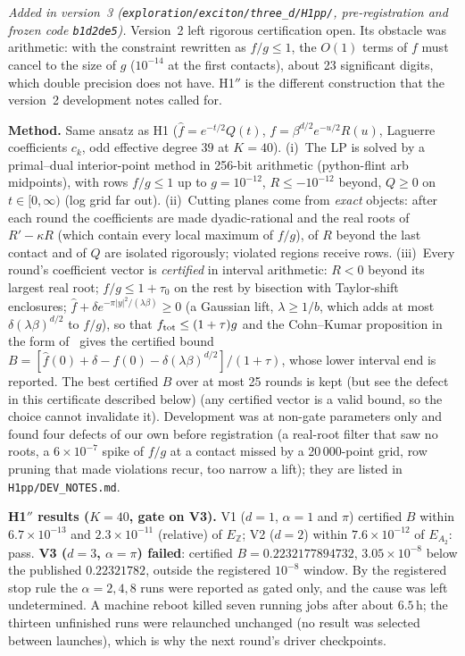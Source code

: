 \emph{Added in version~3 (\texttt{exploration/exciton/three\_d/H1pp/}, pre-registration and frozen code \texttt{b1d2de5}).}
Version~2 left rigorous certification open. Its obstacle was arithmetic: with the constraint rewritten as $f/g\le1$, the
$O(1)$ terms of $f$ must cancel to the size of $g$ ($10^{-14}$ at the first contacts), about 23 significant digits, which
double precision does not have. H1$''$ is the different construction that the version~2 development notes called for.

\textbf{Method.} Same ansatz as H1 ($\hat f=e^{-t/2}Q(t)$, $f=\beta^{d/2}e^{-u/2}R(u)$, Laguerre coefficients $c_k$, odd effective
degree $39$ at $K=40$). (i)~The LP is solved by a primal--dual interior-point method in 256-bit arithmetic (python-flint arb
midpoints), with rows $f/g\le1$ up to $g=10^{-12}$, $R\le-10^{-12}$ beyond, $Q\ge0$ on $t\in[0,\infty)$ (log grid far out).
(ii)~Cutting planes come from \emph{exact} objects: after each round the coefficients are made dyadic-rational and the real roots
of $R'-\kappa R$ (which contain every local maximum of $f/g$), of $R$ beyond the last contact and of $Q$ are isolated
rigorously; violated regions receive rows. (iii)~Every round's coefficient vector is \emph{certified} in interval arithmetic:
$R<0$ beyond its largest real root; $f/g\le1+\tau_0$ on the rest by bisection with Taylor-shift enclosures; $\hat f+\delta
e^{-\pi|y|^2/(\lambda\beta)}\ge0$ (a Gaussian lift, $\lambda\ge1/b$, which adds at most $\delta(\lambda\beta)^{d/2}$ to $f/g$), so
that $f_{\rm tot}\le(1+\tau)g$ and the Cohn--Kumar proposition in the form of~\cite[Prop.~2.2]{CdCI16} gives the certified
bound $B=[\hat f(0)+\delta-f(0)-\delta(\lambda\beta)^{d/2}]/(1+\tau)$, whose lower interval end is reported. The best
certified $B$ over at most 25 rounds is kept (but see the defect in this certificate described below) (any certified vector is a valid bound, so the choice cannot invalidate it).
Development was at non-gate parameters only and found four defects of our own before registration (a real-root filter that
saw no roots, a $6\times10^{-7}$ spike of $f/g$ at a contact missed by a 20\,000-point grid, row pruning that made violations
recur, too narrow a lift); they are listed in \texttt{H1pp/DEV\_NOTES.md}.

\textbf{H1$''$ results ($K=40$, gate on V3).} V1 ($d=1$, $\alpha=1$ and $\pi$) certified $B$ within $6.7\times10^{-13}$
and $2.3\times10^{-11}$ (relative) of $E_{\mathbb Z}$; V2 ($d=2$) within $7.6\times10^{-12}$ of $E_{A_2}$: pass. \textbf{V3
($d=3$, $\alpha=\pi$) failed}: certified $B=0.2232177894732$, $3.05\times10^{-8}$ below the published $0.22321782$, outside the
registered $10^{-8}$ window. By the registered stop rule the $\alpha=2,4,8$ runs were reported as gated only, and the cause was left
undetermined. A machine reboot killed seven running jobs after about $6.5$\,h; the thirteen unfinished runs were relaunched
unchanged (no result was selected between launches), which is why the next round's driver checkpoints.

